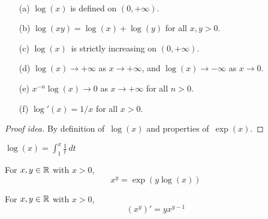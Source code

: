 \begin{thm}
\ 
\begin{enumerate}[itemsep=0pt]
\item[(a)] \(\log(x)\) is defined on \((0,+\infty)\).
\item[(b)] \(\log(xy)=\log(x)+\log(y)\) for all \(x,y>0\).
\item[(c)] \(\log(x)\)~is strictly increasing on \((0,+\infty)\).
\item[(d)] \(\log(x)\to+\infty\) as \(x\to+\infty\), and \(\log(x)\to-\infty\) as \(x\to0\).
\item[(e)] \(x^{-n}\log(x)\to0\) as \(x\to+\infty\) for all \(n>0\).
\item[(f)] \(\log'(x)=1/x\) for all \(x>0\).
\end{enumerate}
\end{thm}
\begin{proof}[Proof idea]
By definition of~\(\log(x)\) and properties of~\(\exp(x)\).
\end{proof}
\begin{cor}
\(\displaystyle\log(x)=\int_1^x\frac{1}{t}\,dt\)
\end{cor}
\begin{cor}[Exponentiation in~\(\R\)]
For \(x,y\in\mathbb{R}\) with \(x>0\),
\[x^y=\exp(y\log(x))\]
\end{cor}
\begin{cor}
For \(x,y\in\mathbb{R}\) with \(x>0\),
\[(x^y)'=yx^{y-1}\]
\end{cor}

